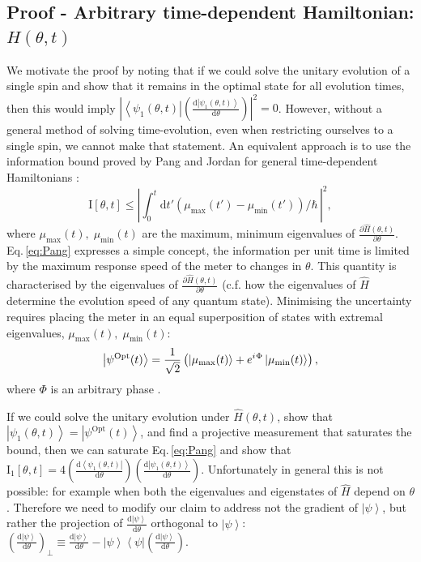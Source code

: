 \documentclass[reqno]{amsart}
\def\be{\begin{equation}}
\def\ee{\end{equation}}
\newcommand{\ket}[1]{\left| #1 \right>}
\newcommand{\bra}[1]{\left< #1 \right|}
\newcommand{\hham}{\hat{H}}
\newcommand{\iu}{{i\mkern1mu}}
\def\func#1#2{\mathrm{#1}\left[#2\right]}
\def\funcwrt#1#2#3{\mathrm{#1}_{\mathrm{#3}}\left[#2\right]}
\begin{document}
\subsection{Proof - Arbitrary time-dependent Hamiltonian: $H(\theta, t)$}\label{App:General}
We motivate the proof by noting that if we could solve the unitary evolution of a single spin and show that it remains in the optimal state for all evolution times, then this would imply $\left|\bra{\psi_1(\theta,t)}\left(\frac{\mathrm{d}\ket{\psi_1(\theta,t)}}{\mathrm{d} \theta}\right)\right|^2 = 0$. However, without a general method of solving time-evolution, even when restricting ourselves to a single spin, we cannot make that statement. An equivalent approach is to use the information bound proved by Pang and Jordan for general time-dependent Hamiltonians \cite{Pang2017}:
\be
\func{I}{\theta,t} \leq \left| \int^t_{0} \mathrm{d}t' \left(\mu_{\mathrm{max}}(t') - \mu_{\mathrm{min}}(t')\right)/\hbar \,\right|^{2},
\label{eq:Pang}
\ee
where $\mu_{\mathrm{max}}(t), \; \mu_{\mathrm{min}}(t)$ are the maximum, minimum eigenvalues of $\frac{\partial \hham(\theta,t)}{\partial \theta}$. Eq.\,\eqref{eq:Pang} expresses a simple concept, the information per unit time is limited by the maximum response speed of the meter to changes in $\theta$. This quantity is characterised by the eigenvalues of $\frac{\partial \hham(\theta,t)}{\partial \theta}$ (c.f. how the eigenvalues of $\hham$ determine the evolution speed of any quantum state). Minimising the uncertainty requires placing the meter in an equal superposition of states with extremal eigenvalues, $\mu_{\mathrm{max}}(t), \; \mu_{\mathrm{min}}(t)$:
\[
\ket{\psi^{\mathrm{Opt}}(t)} = \frac{1}{\sqrt{2}}\left(\ket{\mu_{\mathrm{max}}(t)} + e^{\iu \Phi}\ket{\mu_{\mathrm{min}}(t)}\right),
\]
where $\Phi$ is an arbitrary phase \cite{Braunstein1996, Giovannetti2006, Childs2000}.

If we could solve the unitary evolution under $\hham(\theta, t)$, show that $\ket{\psi_1(\theta,t)} = \ket{\psi^{\mathrm{Opt}}(t)}$, and find a projective measurement that saturates the bound, then we can saturate Eq.\,\eqref{eq:Pang} and show that $\funcwrt{I}{\theta,t}{1} = 4\left(\frac{\mathrm{d}\bra{\psi_1(\theta,t)}}{\mathrm{d} \theta}\right)\left(\frac{\mathrm{d}\ket{\psi_1(\theta,t)}}{\mathrm{d} \theta}\right)$. Unfortunately in general this is not possible: for example when both the eigenvalues and eigenstates of $\hham$ depend on $\theta$. Therefore we need to modify our claim to address not the gradient of $\ket{\psi}$, but rather the projection of $\frac{\mathrm{d}\ket{\psi}}{\mathrm{d} \theta}$ orthogonal to $\ket{\psi}$: $\left(\frac{\mathrm{d}\ket{\psi}}{\mathrm{d} \theta}\right)_{\perp} \equiv \frac{\mathrm{d}\ket{\psi}}{\mathrm{d}\theta}-\ket{\psi}\bra{\psi}\left(\frac{\mathrm{d}\ket{\psi}}{\mathrm{d}\theta}\right)$.\\
\end{document}
